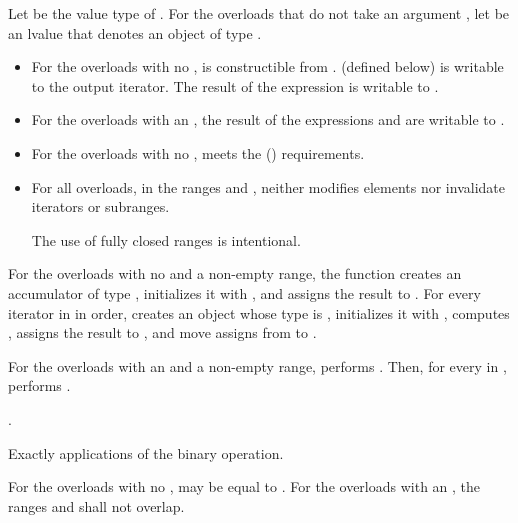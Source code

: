 \begin{itemdescr}
\pnum
Let  be the value type of .
For the overloads that do not take an argument ,
let  be an lvalue
that denotes an object of type .

\pnum
\mandates
\begin{itemize}
\item
  For the overloads with no ,
   is constructible from .
   (defined below) is
  writable
  to the  output iterator.
  The result of the expression 
  is writable to .
\item
  For the overloads with an ,
  the result of the expressions  and
   are writable to .
\end{itemize}

\pnum
\expects
\begin{itemize}
\item
  For the overloads with no ,
   meets the  ()
  requirements.
\item
  For all overloads, in the ranges 
  and ,
   neither modifies elements
  nor invalidate iterators or subranges.
\begin{footnote}
The use of fully closed ranges is intentional.
\end{footnote}
\end{itemize}


\pnum
\effects
For the overloads with no  and a non-empty range,
the function creates an accumulator  of type ,
initializes it with ,
and assigns the result to .
For every iterator  in  in order,
creates an object  whose type is ,
initializes it with ,
computes ,
assigns the result to , and
move assigns from  to .

\pnum
For the overloads with an  and a non-empty range,
performs .
Then, for every  in ,
performs .

\pnum
\returns
{}.

\pnum
\complexity
Exactly  applications of the binary operation.

\pnum
\remarks
For the overloads with no ,
 may be equal to .
For the overloads with an ,
the ranges  and 
shall not overlap.
\end{itemdescr}

